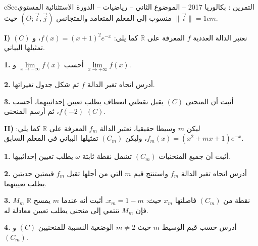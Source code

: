 \documentclass[12pt,a4paper]{article}
\newenvironment{BOX}[2]{\begin{otherlanguage}{english}\begin{arbox}{#1}{#2}}{\end{arbox}\end{otherlanguage}}
\newcounter{exo}
\newenvironment{tamrin}[1]{\stepcounter{exo}\begin{BOX}{cSec}{التمرين \theexo: #1}}{\end{BOX}}
\newcommand{\R}{\mathbb{R}}
\newcommand{\QQ}[1]{\par\smallskip\textbf{#1.} }
\begin{document}
\begin{tamrin}{بكالوريا 2017 -- الموضوع الثاني -- رياضيات -- الدورة الاستثنائية}
المستوي منسوب إلى المعلم المتعامد والمتجانس $(O;\vec i,\vec j)$ حيث $\|\vec i\|=1cm$.

\textbf{I)} نعتبر الدالة العددية $f$ المعرفة على $\R$ كما يلي: $f(x)=(x+1)^2e^{-x}$، و $(C)$ تمثيلها البياني.
\QQ{1} أحسب $\lim\limits_{x\to-\infty}f(x)$ و $\lim\limits_{x\to+\infty}f(x)$.
\QQ{2} أدرس اتجاه تغير الدالة $f$ ثم شكل جدول تغيراتها.
\QQ{3} أثبت أن المنحنى $(C)$ يقبل نقطتي انعطاف يطلب تعيين إحداثييهما، أحسب $f(-2)$، ثم أرسم المنحنى $(C)$.

\textbf{II)} ليكن $m$ وسيطا حقيقيا، نعتبر الدالة $f_m$ المعرفة على $\R$ كما يلي: $f_m(x)=\left(x^2+mx+1\right)e^{-x}$، وليكن $(C_m)$ تمثيلها البياني في المعلم السابق.
\QQ{1} أثبت أن جميع المنحنيات $(C_m)$ تشمل نقطة ثابتة $\omega$ يطلب تعيين إحداثييها.
\QQ{2} أدرس اتجاه تغير الدالة $f_m$ واستنتج قيم $m$ التي من أجلها تقبل $f_m$ قيمتين حديتين يطلب تعيينهما.
\QQ{3} $M_m$ نقطة من $(C_m)$ فاصلتها $x_m$ حيث: $x_m=1-m$.
أثبت أنه عندما $m$ يمسح $\R$ فإن $M_m$ تنتمي إلى منحنى يطلب تعيين معادلة له.
\QQ{4} أدرس حسب قيم الوسيط $m$ حيث $m\neq2$ الوضعية النسبية للمنحنيين $(C)$ و $(C_m)$.
\end{tamrin}
\end{document}
